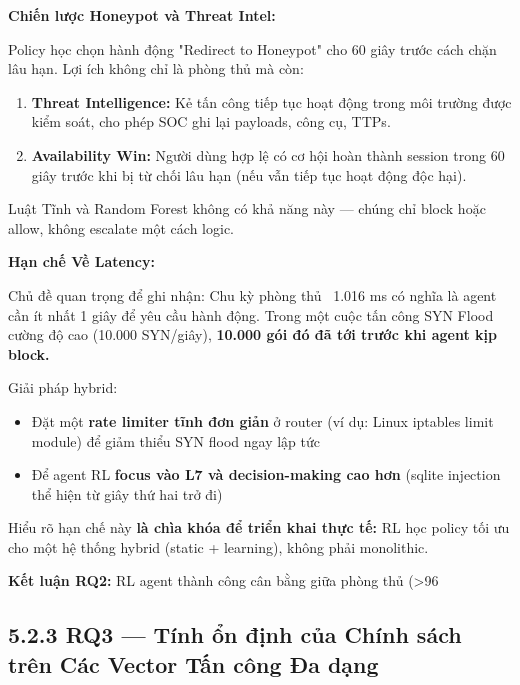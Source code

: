 \documentclass[12pt,a4paper,twoside]{report}
\begin{document}
{{{{{{{{{{\textbf{Chiến lược Honeypot và Threat Intel:}

Policy học chọn hành động "Redirect to Honeypot" cho 60 giây trước cách chặn lâu hạn. Lợi ích không chỉ là phòng thủ mà còn:
\begin{enumerate}
\item \textbf{Threat Intelligence:} Kẻ tấn công tiếp tục hoạt động trong môi trường được kiểm soát, cho phép SOC ghi lại payloads, công cụ, TTPs.
\item \textbf{Availability Win:} Người dùng hợp lệ có cơ hội hoàn thành session trong 60 giây trước khi bị từ chối lâu hạn (nếu vẫn tiếp tục hoạt động độc hại).
\end{enumerate}

Luật Tĩnh và Random Forest không có khả năng này — chúng chỉ block hoặc allow, không escalate một cách logic.

\textbf{Hạn chế Về Latency:}

Chủ đề quan trọng để ghi nhận: Chu kỳ phòng thủ ~1.016 ms có nghĩa là agent cần ít nhất 1 giây để yêu cầu hành động. Trong một cuộc tấn công SYN Flood cường độ cao (10.000 SYN/giây), \textbf{10.000 gói đó đã tới trước khi agent kịp block.}

Giải pháp hybrid:
\begin{itemize}
\item Đặt một \textbf{rate limiter tĩnh đơn giản} ở router (ví dụ: Linux iptables limit module) để giảm thiểu SYN flood ngay lập tức
\item Để agent RL \textbf{focus vào L7 và decision-making cao hơn} (sqlite injection thể hiện từ giây thứ hai trở đi)
\end{itemize}

Hiểu rõ hạn chế này \textbf{là chìa khóa để triển khai thực tế:} RL học policy tối ưu cho một hệ thống hybrid (static + learning), không phải monolithic.

\textbf{Kết luận RQ2:} RL agent thành công cân bằng giữa phòng thủ (>96%


\subsection{5.2.3 RQ3 — Tính ổn định của Chính sách trên Các Vector Tấn công Đa dạng}

}}}}}}}}}}
\end{document}
